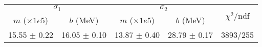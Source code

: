 \begin{tabular}{cc|cc||c}
\multicolumn{2}{c|}{$\sigma_1$} & \multicolumn{2}{|c}{$\sigma_2$}  & \multirow{2}{*}{$\chi^2/$ndf}\\
$m$ ($\times1e5$) & $b$ (MeV) & $m$ ($\times1e5$) & $b$ (MeV)  & \\
\hline
15.55 $\pm$ 0.22 & 16.05 $\pm$ 0.10 & 13.87 $\pm$ 0.40 & 28.79 $\pm$ 0.17 & 3893/255\\
\end{tabular}
